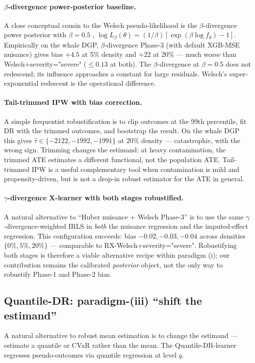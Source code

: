 \paragraph{$\beta$-divergence power-posterior baseline.}
A close conceptual cousin to the Welsch pseudo-likelihood is the
$\beta$-divergence power posterior with $\beta = 0.5$
\citep{basu1998robust}, $\log L_\beta(\theta) =
(1/\beta)[\exp(\beta \log f_\theta) - 1]$. Empirically on the
whale DGP, $\beta$-divergence Phase-3 (with default XGB-MSE
nuisance) gives bias $+4.5$ at 5\% density and $+22$ at 20\% --- much
worse than Welsch+severity="severe" ($\le 0.13$ at both). The
$\beta$-divergence at $\beta = 0.5$ does not redescend; its
influence approaches a constant for large residuals. Welsch's
super-exponential redescent is the operational difference.

\paragraph{Tail-trimmed IPW with bias correction.}
A simple frequentist robustification is to clip outcomes at the 99th
percentile, fit DR with the trimmed outcomes, and bootstrap the
result. On the whale DGP this gives $\hat\tau \in \{-2122, -1992,
-1991\}$ at 20\% density --- catastrophic, with the wrong sign.
Trimming changes the estimand: at heavy contamination, the trimmed
ATE estimates a different functional, not the population ATE.
Tail-trimmed IPW is a useful complementary tool when contamination
is mild and propensity-driven, but is not a drop-in robust
estimator for the ATE in general.

\paragraph{$\gamma$-divergence X-learner with both stages robustified.}
A natural alternative to ``Huber nuisance + Welsch Phase-3'' is to
use the same $\gamma$-divergence-weighted IRLS in \emph{both} the
nuisance regression and the imputed-effect regression. This
configuration succeeds: bias $-0.02, -0.03, -0.04$ across densities
$\{0\%, 5\%, 20\%\}$ --- comparable to RX-Welsch+severity="severe".
Robustifying both stages is therefore a viable alternative recipe
within paradigm (i); our contribution remains the calibrated
\emph{posterior} object, not the only way to robustify Phase-1 and
Phase-2 bias.

\subsection{Quantile-DR: paradigm-(iii) ``shift the estimand''}
\label{sec:experiments:quantile_dr}
A natural alternative to robust mean estimation is to change the
estimand --- estimate a quantile or CVaR rather than the mean. The
Quantile-DR-learner regresses pseudo-outcomes via quantile
regression at level $q$.

